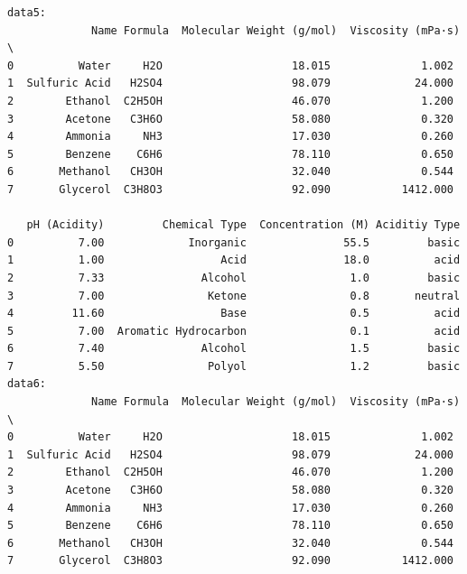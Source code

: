 \documentclass[
  letterpaper,
  DIV=11,
  numbers=noendperiod]{scrreprt}
\begin{document}
\begin{verbatim}
data5: 
             Name Formula  Molecular Weight (g/mol)  Viscosity (mPa·s)  \
0          Water     H2O                    18.015              1.002   
1  Sulfuric Acid   H2SO4                    98.079             24.000   
2        Ethanol  C2H5OH                    46.070              1.200   
3        Acetone   C3H6O                    58.080              0.320   
4        Ammonia     NH3                    17.030              0.260   
5        Benzene    C6H6                    78.110              0.650   
6       Methanol   CH3OH                    32.040              0.544   
7       Glycerol  C3H8O3                    92.090           1412.000   

   pH (Acidity)         Chemical Type  Concentration (M) Aciditiy Type  
0          7.00             Inorganic               55.5         basic  
1          1.00                  Acid               18.0          acid  
2          7.33               Alcohol                1.0         basic  
3          7.00                Ketone                0.8       neutral  
4         11.60                  Base                0.5          acid  
5          7.00  Aromatic Hydrocarbon                0.1          acid  
6          7.40               Alcohol                1.5         basic  
7          5.50                Polyol                1.2         basic  
data6: 
             Name Formula  Molecular Weight (g/mol)  Viscosity (mPa·s)  \
0          Water     H2O                    18.015              1.002   
1  Sulfuric Acid   H2SO4                    98.079             24.000   
2        Ethanol  C2H5OH                    46.070              1.200   
3        Acetone   C3H6O                    58.080              0.320   
4        Ammonia     NH3                    17.030              0.260   
5        Benzene    C6H6                    78.110              0.650   
6       Methanol   CH3OH                    32.040              0.544   
7       Glycerol  C3H8O3                    92.090           1412.000   


\end{verbatim}
\end{document}
